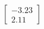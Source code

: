 \documentclass[preview]{standalone}
\begin{document}
\begin{align*}
\begin{bmatrix} -3.23 \\ 2.11 \end{bmatrix}
\end{align*}
\end{document}
